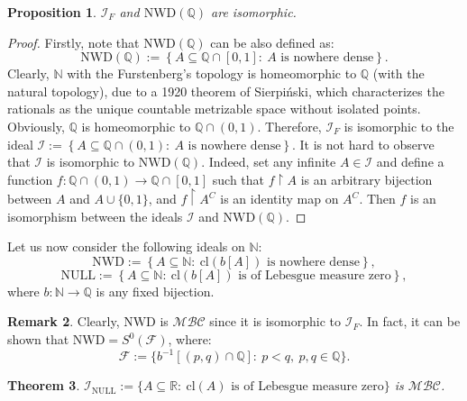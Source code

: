 \documentclass{amsart}
\newtheorem{thm}{Theorem}[section]
\newtheorem{prop}[thm]{Proposition}
\theoremstyle{definition}
\newtheorem{remark}[thm]{Remark}
\newcommand{\N}{{\mathbb N}}
\newcommand{\R}{{\mathbb R}}
\newcommand{\Q}{{\mathbb Q}}
\newcommand{\I}{\mathcal I}
\newcommand{\MB}{S^0}
\newcommand{\MBC}{\mathcal{MBC}}
\newcommand{\NULL}{\mathrm{NULL}}
\newcommand{\NWD}{\mathrm{NWD}}
\newcommand{\INULL}{\I_\mathrm{NULL}}
\newcommand{\cl}{\mathrm{cl}}
\begin{document}
\begin{prop}
$\I_F$ and $\NWD(\Q)$ are isomorphic.
\end{prop}

\begin{proof}
Firstly, note that $\NWD(\Q)$ can be also defined as:
$$\NWD(\Q) := \left\{A\subseteq\mathbb{Q}\cap [0,1] :\ A \textrm{ is nowhere dense}\right\}.$$
Clearly, $\N$ with the Furstenberg's topology is homeomorphic to $\Q$ (with the natural topology), due to a 1920 theorem of Sierpi\'nski, which characterizes the rationals as the unique countable metrizable space without isolated points. Obviously, $\Q$ is homeomorphic to $\Q\cap (0,1)$. Therefore, $\I_F$ is isomorphic to the ideal $\I := \left\{A\subseteq\Q\cap (0,1) :\ A \textrm{ is nowhere dense}\right\}$. It is not hard to observe that $\I$ is isomorphic to $\NWD(\Q)$. Indeed, set any infinite $A\in\I$ and define a function $f \colon \Q\cap (0,1) \to \Q\cap [0,1]$ such that $f\upharpoonright A$ is an arbitrary bijection between $A$ and $A\cup\{0,1\}$, and $f\upharpoonright A^C$ is an identity map on $A^C$. Then $f$ is an isomorphism between the ideals $\I$ and $\NWD(\Q)$.
\end{proof}

Let us now consider the following ideals on $\N$:
$$\NWD :=\left\{A\subseteq\N :\ \cl(b[A]) \textrm{ is nowhere dense}\right\},$$
$$\NULL :=\left\{A\subseteq\N :\ \cl(b[A]) \textrm{ is of Lebesgue measure zero}\right\},$$
where $b\colon\N\to\Q$ is any fixed bijection.

\begin{remark}
Clearly, $\NWD$ is $\MBC$ since it is isomorphic to $\I_F$. In fact, it can be shown that $\NWD = \MB(\mathcal{F})$, where:
$$\mathcal{F} := \{b^{-1}[(p, q)\cap\Q] :\ p < q,\ p, q \in \Q\}.$$
\end{remark}

\begin{thm}
$\INULL := \{A \subseteq\R :\ \cl(A) \textrm{ is of Lebesgue measure zero}\}$ is $\MBC$.
\end{thm}
\end{document}
